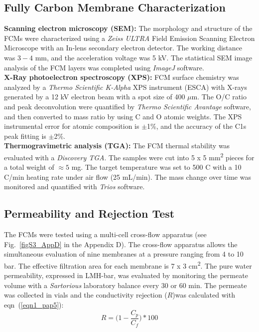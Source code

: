\subsection{Fully Carbon Membrane Characterization}
\textbf{Scanning electron microscopy (SEM):} The morphology and structure of the FCMs were characterized using a \textit{Zeiss ULTRA} Field Emission Scanning Electron Microscope with an In-lens secondary electron detector. The working distance was $3-4$ mm, and the acceleration voltage was 5 kV. The statistical SEM image analysis of the FCM layers was completed using \textit{ImageJ} software.\\
\textbf{X-Ray photoelectron spectroscopy (XPS):} FCM surface chemistry was analyzed by a \textit{Thermo Scientific K-Alpha} XPS instrument (ESCA) with X-rays generated by a 12 kV electron beam with a spot size of 400 $\mu$m. The O/C ratio and peak deconvolution were quantified by \textit{Thermo Scientific Avantage} software, and then converted to mass ratio by using C and O atomic weights. The XPS instrumental error for atomic composition is $\pm$1\%, and the accuracy of the C1s peak fitting is $\pm$2\%.\\
\textbf{Thermogravimetric analysis (TGA):} The FCM thermal stability was evaluated with a \textit{Discovery TGA}. The samples were cut into 5 x 5 mm\textsuperscript{2} pieces for a total weight of $\approx5$ mg. The target temperature was set to 500 \textdegree C with a 10 \textdegree C/min heating rate under air flow (25 mL/min). The mass change over time was monitored and quantified with \textit{Trios} software.
\subsection{Permeability and Rejection Test}
The FCMs were tested using a multi-cell cross-flow apparatus (see Fig.~\ref{figS3_AppD} in the Appendix D). The cross-flow apparatus allows the simultaneous evaluation of nine membranes at a pressure ranging from 4 to 10 bar. The effective filtration area for each membrane is 7 x 3 cm\textsuperscript{2}.  The pure water permeability, expressed in LMH-bar, was evaluated by monitoring the permeate volume with a \textit{Sartorious} laboratory balance every 30 or 60 min.
The permeate was collected in vials and the conductivity rejection ($R$)was calculated with eqn~(\ref{eqn1_pap5}): 
\begin{equation}
  R ={\Big(1- \dfrac{C_{p}}{C_{f}}\Big)*100}
 \label{eqn1_pap5}
\end{equation}

